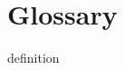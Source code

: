 
\section*{Glossary}

\begin{doublespacing}
\begin{description}[leftmargin=1in, style=nextline]

\setlength\itemsep{1em}





    \item[term]

    definition





\end{description}
\end{doublespacing}
